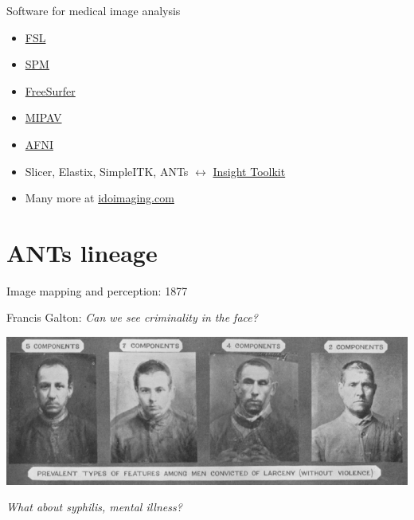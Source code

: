 \documentclass[ignorenonframetext,]{beamer}
\begin{document}
\begin{frame}{Software for medical image analysis}

\begin{itemize}
\item
  \href{http://fsl.fmrib.ox.ac.uk/fsldownloads/}{FSL}
\item
  \href{http://www.fil.ion.ucl.ac.uk/spm/software/}{SPM}
\item
  \href{http://www.fil.ion.ucl.ac.uk/spm/software/}{FreeSurfer}
\item
  \href{http://mipav.cit.nih.gov}{MIPAV}
\item
  \href{https://afni.nimh.nih.gov/afni}{AFNI}
\item
  Slicer, Elastix, SimpleITK, ANTs \(\longleftrightarrow\)
  \href{http://www.itk.org}{Insight Toolkit}
\item
  Many more at \href{http://idoimaging.com}{idoimaging.com}
\end{itemize}

\end{frame}

\section{ANTs lineage}\label{ants-lineage}

\begin{frame}{Image mapping and perception: 1877}

Francis Galton: \emph{Can we see criminality in the face?}

\includegraphics{./figures/galton.png}

\emph{What about syphilis, mental illness?}

\end{frame}
\end{document}
